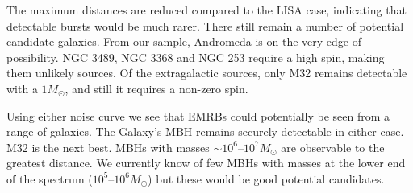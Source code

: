 The maximum distances are reduced compared to the LISA case, indicating that detectable bursts would be much rarer. There still remain a number of potential candidate galaxies. From our sample, Andromeda is on the very edge of possibility. NGC 3489, NGC 3368 and NGC 253 require a high spin, making them unlikely sources. Of the extragalactic sources, only M32 remains detectable with a $1 M_\odot$, and still it requires a non-zero spin.

Using either noise curve we see that EMRBs could potentially be seen from a range of galaxies. The Galaxy's MBH remains securely detectable in either case. M32 is the next best. MBHs with masses $\sim 10^6$--$10^7 M_\odot$ are observable to the greatest distance. We currently know of few MBHs with masses at the lower end of the spectrum ($10^5$--$10^6 M_\odot$) but these would be good potential candidates.